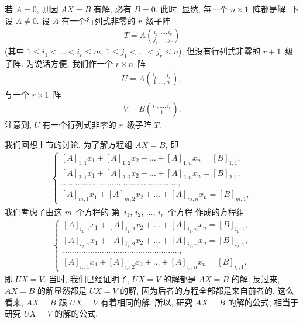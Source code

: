 若 \(A = 0\),
则因 \(AX = B\) 有解,
必有 \(B = 0\).
此时, 显然, 每一个 \(n \times 1\)~阵都是解.
下设 \(A \neq 0\).
设 \(A\) 有一个行列式非零的 \(r\)~级子阵
\begin{align*}
    T = A\binom{i_1,\dots,i_r}{j_1,\dots,j_r}
\end{align*}
(其中
\(1 \leq i_1 < \dots < i_r \leq m\),
\(1 \leq j_1 < \dots < j_r \leq n\)),
但没有行列式非零的 \(r+1\)~级子阵.
为说话方便, 我们作一个 \(r \times n\)~阵
\begin{align*}
    U = A\binom{i_1,\dots,i_r}{1,\dots,n},
\end{align*}
与一个 \(r \times 1\)~阵
\begin{align*}
    V = B\binom{i_1,\dots,i_r}{1}
    .
\end{align*}
注意到, \(U\) 有一个行列式非零的 \(r\)~级子阵 \(T\).

我们回想上节的讨论.
为了解方程组 \(AX = B\), 即
\begin{align*}
    \begin{cases}
        [A]_{1,1} x_1 + [A]_{1,2} x_2 + \dots
        + [A]_{1,n} x_n = [B]_{1,1},
        \\
        [A]_{2,1} x_1 + [A]_{2,2} x_2 + \dots
        + [A]_{2,n} x_n = [B]_{2,1},
        \\
        \dots
        \dots \dots \dots \dots
        \dots \dots \dots \dots
        \dots \dots \dots \dots
        \dots \dots \dots \dots,
        \\
        [A]_{m,1} x_1 + [A]_{m,2} x_2 + \dots
        + [A]_{m,n} x_n = [B]_{m,1},
    \end{cases}
\end{align*}
我们考虑了由这 \(m\)~个方程的%
第~\(i_1\), \(i_2\), \(\dots\), \(i_r\)~个方程%
作成的方程组
\begin{align*}
    \begin{cases}
        [A]_{i_1,1} x_1 + [A]_{i_1,2} x_2 + \dots
        + [A]_{i_1,n} x_n = [B]_{i_1,1},
        \\
        [A]_{i_2,1} x_1 + [A]_{i_2,2} x_2 + \dots
        + [A]_{i_2,n} x_n = [B]_{i_2,1},
        \\
        \dots
        \dots \dots \dots \dots
        \dots \dots \dots \dots
        \dots \dots \dots \dots
        \dots \dots \dots \dots,
        \\
        [A]_{i_r,1} x_1 + [A]_{i_r,2} x_2 + \dots
        + [A]_{i_r,n} x_n = [B]_{i_r,1},
    \end{cases}
\end{align*}
即 \(UX = V\).
当时, 我们已经证明了,
\(UX = V\) 的解都是 \(AX = B\) 的解.
反过来, \(AX = B\) 的解显然都是 \(UX = V\) 的解,
因为后者的方程全部都是来自前者的.
这么看来, \(AX = B\) 跟 \(UX = V\) 有着相同的解.
所以, 研究 \(AX = B\) 的解的公式,
相当于研究 \(UX = V\) 的解的公式.

